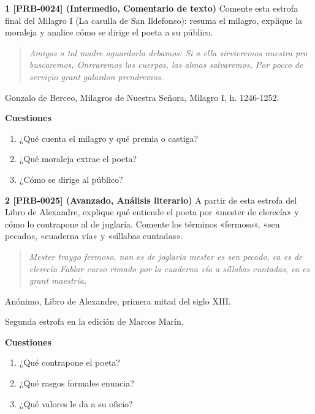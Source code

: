 \documentclass{book}
\begin{document}
\begin{tcolorbox}[title={Ejercicios}, studiumworked, breakable]

\noindent\textbf{1 [PRB-0024] (Intermedio, Comentario de texto)}
Comente esta estrofa final del Milagro I (La casulla de San Ildefonso): resuma el milagro, explique la moraleja y analice cómo se dirige el poeta a su público.


\begin{quote}
\itshape Amigos a tal madre aguardarla debamos: Si a ella sirvieremos nuestra pro buscaremos, Onrraremos los cuerpos, las almas salvaremos, Por pocco de serviçio grant galardon prendremos.
\end{quote}
{\noindent\footnotesize Gonzalo de Berceo, Milagros de Nuestra Señora, Milagro I, h. 1246-1252.\par}

\noindent\textbf{Cuestiones}
\begin{enumerate}
\item ¿Qué cuenta el milagro y qué premia o castiga?
\item ¿Qué moraleja extrae el poeta?
\item ¿Cómo se dirige al público?
\end{enumerate}

\noindent\textbf{2 [PRB-0025] (Avanzado, Análisis literario)}
A partir de esta estrofa del Libro de Alexandre, explique qué entiende el poeta por «mester de clerecía» y cómo lo contrapone al de juglaría. Comente los términos «fermoso», «sen pecado», «cuaderna vía» y «síllabas cuntadas».


\begin{quote}
\itshape Mester traygo fermoso, non es de joglaria mester es sen pecado, ca es de clerecía Fablar curso rimado por la cuaderna vía a síllabas cuntadas, ca es grant maestría.
\end{quote}
{\noindent\footnotesize Anónimo, Libro de Alexandre, primera mitad del siglo XIII.\par}
{\noindent\footnotesize Segunda estrofa en la edición de Marcos Marín.\par}

\noindent\textbf{Cuestiones}
\begin{enumerate}
\item ¿Qué contrapone el poeta?
\item ¿Qué rasgos formales enuncia?
\item ¿Qué valores le da a su oficio?
\end{enumerate}


\end{tcolorbox}
\end{document}
